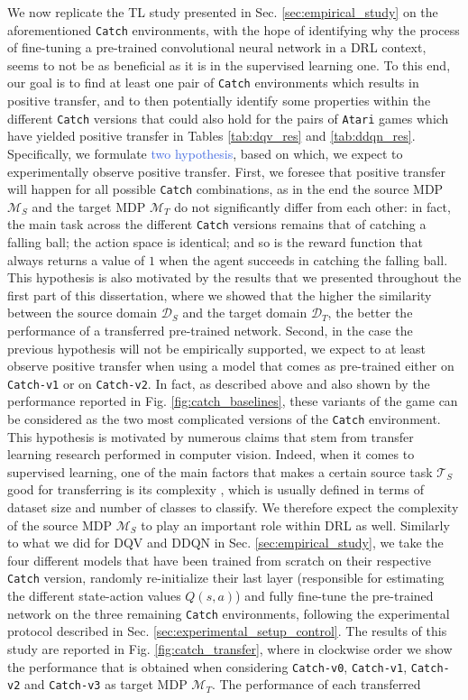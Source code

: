 We now replicate the TL study presented in Sec. \ref{sec:empirical_study} on the aforementioned \texttt{Catch} environments, with the hope of identifying why the process of fine-tuning a pre-trained convolutional neural network in a DRL context, seems to not be as beneficial as it is in the supervised learning one. To this end, our goal is to find at least one pair of \texttt{Catch} environments which results in positive transfer, and to then potentially identify some properties within the different \texttt{Catch} versions that could also hold for the pairs of \texttt{Atari} games which have yielded positive transfer in Tables \ref{tab:dqv_res} and \ref{tab:ddqn_res}. Specifically, we formulate \textcolor{RoyalBlue}{two hypothesis}, based on which, we expect to experimentally observe positive transfer. First, we foresee that positive transfer will happen for all possible \texttt{Catch} combinations, as in the end the source MDP $\mathcal{M}_S$ and the target MDP $\mathcal{M}_T$ do not significantly differ from each other: in fact, the main task across the different \texttt{Catch} versions remains that of catching a falling ball; the action space is identical; and so is the reward function that always returns a value of $1$ when the agent succeeds in catching the falling ball. This hypothesis is also motivated by the results that we presented throughout the first part of this dissertation, where we showed that the higher the similarity between the source domain $\mathcal{D}_S$ and the target domain $\mathcal{D}_T$, the better the performance of a transferred pre-trained network. Second, in the case the previous hypothesis will not be empirically supported, we expect to at least observe positive transfer when using a model that comes as pre-trained either on \texttt{Catch-v1} or on \texttt{Catch-v2}. In fact, as described above and also shown by the performance reported in Fig. \ref{fig:catch_baselines}, these variants of the game can be considered as the two most complicated versions of the \texttt{Catch} environment. This hypothesis is motivated by numerous claims that stem from transfer learning research performed in computer vision. Indeed, when it comes to supervised learning, one of the main factors that makes a certain source task $\mathcal{T}_S$ good for transferring is its complexity \cite{}, which is usually defined in terms of dataset size and number of classes to classify. We therefore expect the complexity of the source MDP $\mathcal{M}_S$ to play an important role within DRL as well. Similarly to what we did for DQV and DDQN in Sec. \ref{sec:empirical_study}, we take the four different models that have been trained from scratch on their respective \texttt{Catch} version, randomly re-initialize their last layer (responsible for estimating the different state-action values $Q(s,a)$) and fully fine-tune the pre-trained network on the three remaining \texttt{Catch} environments, following the experimental protocol described in Sec. \ref{sec:experimental_setup_control}. The results of this study are reported in Fig. \ref{fig:catch_transfer}, where in clockwise order we show the performance that is obtained when considering \texttt{Catch-v0}, \texttt{Catch-v1}, \texttt{Catch-v2} and \texttt{Catch-v3} as target MDP $\mathcal{M}_T$. The performance of each transferred 